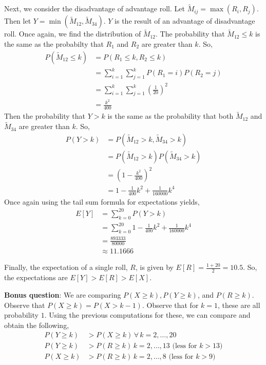 \documentclass{article}
\begin{document}
Next, we consider the disadvantage of advantage roll. Let $\tilde{M}_{ij} = \max(R_i, R_j)$. Then let $Y = \min(\tilde{M}_{12}, \tilde{M}_{34})$. $Y$ is the result of an advantage of disadvantage roll. Once again, we find the distribution of $\tilde{M}_{12}$. The probability that $\tilde{M}_{12} \leq k$ is the same as the probabilty that $R_1$ and $R_2$ are greater than $k$. So,
\begin{align*}
    P(\tilde{M}_{12} \leq k) &= P(R_1 \leq k, R_2 \leq k) \\
    &= \sum_{i = 1}^k \sum_{j = 1}^k P(R_1 = i) P(R_2 = j) \\
    &= \sum_{i = 1}^k \sum_{j = 1}^k \left(\frac{1}{20}\right)^2 \\
    &= \frac{k^2}{400}
\end{align*}
Then the probability that $Y > k$ is the same as the probability that both $\tilde{M}_{12}$ and $\tilde{M}_{34}$ are greater than $k$. So,
\begin{align*}
    P(Y > k) &= P(\tilde{M}_{12} > k, \tilde{M}_{34} > k) \\
    &= P(\tilde{M}_{12} > k)P(\tilde{M}_{34} > k) \\
    &= \left(1 - \frac{k^2}{400}\right)^2 \\
    &= 1 - \frac{1}{400} k^2 + \frac{1}{160000} k^4
\end{align*}
Once again using the tail sum formula for expectations yields,
\begin{align*}
    E[Y] &= \sum_{k = 0}^{20} P(Y > k) \\
    &= \sum_{k = 0}^{20} 1 - \frac{1}{400} k^2 + \frac{1}{160000} k^4 \\
    &= \frac{893333}{80000} \\
    &\approx 11.1666
\end{align*}

Finally, the expectation of a single roll, $R$, is given by $E[R] = \frac{1 + 20}{2} = 10.5$. So, the expectations are $E[Y] > E[R] > E[X]$. 

\textbf{Bonus question}: We are comparing $P(X \geq k), P(Y \geq k)$, and $P(R \geq k)$. Observe that $P(X \geq k) = P(X > k - 1)$. Observe that for $k = 1$, these are all probability $1$. Using the previous computations for these, we can compare and obtain the following,
\begin{align*}
    P(Y \geq k) &> P(X \geq k) \, \forall \, k = 2, \dots, 20 \\
    P(Y \geq k) &> P(R \geq k) \, k = 2, \dots, 13 \text{ (less for $k > 13$)} \\
    P(X \geq k) &> P(R \geq k) \, k = 2, \dots, 8 \text{ (less for $k > 9$)}
\end{align*}
\end{document}
